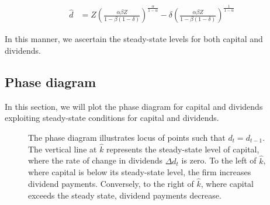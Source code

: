 \documentclass[12pt]{report}
\begin{document}
\begin{align}
    \widehat{d} &= Z \left( \frac{\alpha \beta Z}{1 - \beta(1 - \delta)} \right)^{\frac{\alpha}{1 - \alpha}} - \delta \left( \frac{\alpha \beta Z}{1 - \beta(1 - \delta)} \right)^{\frac{1}{1 - \alpha}}
\end{align}



In this manner, we ascertain the steady-state levels for both capital and dividends.
\subsection{Phase diagram}

In this section, we will plot the phase diagram for capital and dividends exploiting steady-state conditions for capital and
dividends. 
\begin{figure}
    \centering
    \caption{The phase diagram illustrates locus of points such that \(d_t=d_{t-1}\). The vertical line at \( \hat{k} \) represents the steady-state level of capital, where
    the rate of change in dividends \( \Delta d_t \) is zero. To the left of \( \hat{k} \), where capital is below its
    steady-state level, the firm increases dividend payments. Conversely, to the right of \( \hat{k} \), where capital
    exceeds the steady state, dividend payments decrease.}
    \label{fig:ph_d_k_nod_1}
\end{figure}
\end{document}
